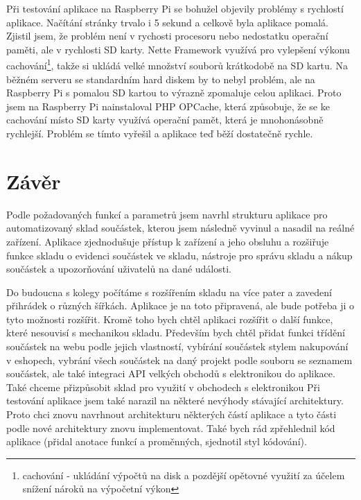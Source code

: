 \documentclass[12pt, a4paper, oneside]{article}
\begin{document}
Při testování aplikace na Raspberry Pi se bohužel objevily problémy s rychlostí aplikace. Načítání stránky trvalo i 5 sekund a celkově byla aplikace pomalá. Zjistil jsem, že problém není v rychosti procesoru nebo nedostatku operační paměti, ale v rychlosti SD karty. Nette Framework využívá pro vylepšení výkonu cachování\footnote{cachování - ukládání výpočtů na disk a pozdější opětovné využití za účelem snížení nároků na výpočetní výkon}, takže si ukládá velké množství souborů krátkodobě na SD kartu. Na běžném serveru se standardním hard diskem by to nebyl problém, ale na Raspberry Pi s pomalou SD kartou to výrazně zpomaluje celou aplikaci. Proto jsem na Raspberry Pi nainstaloval PHP OPCache, která způsobuje, že se ke cachování místo SD karty využívá operační pamět, která je mnohonásobně rychlejší. Problém se tímto vyřešil a aplikace teď běží dostatečně rychle.



\newpage

\section*{Závěr} %

Podle požadovaných funkcí a parametrů jsem navrhl strukturu aplikace pro automatizovaný sklad součástek, kterou  jsem následně vyvinul a nasadil na reálné zařízení.
Aplikace zjednodušuje přístup k zařízení a jeho obsluhu a rozšiřuje funkce skladu o evidenci součástek ve skladu, nástroje pro správu skladu a nákup součástek a upozorňování uživatelů na dané události.

Do budoucna s kolegy počítáme s rozšířením skladu na více pater a zavedení přihrádek o různých šířkách. Aplikace je na toto připravená, ale bude potřeba ji o tyto možnosti rozšířit.
Kromě toho bych chtěl aplikaci rozšířit o další funkce, které nesouvisí s mechanikou skladu. Především bych chtěl přidat funkci třídění součástek na webu podle jejich vlastností, vybírání součástek stylem nakupování v eshopech, vybrání všech součástek na daný projekt podle souboru se seznamem součástek, ale také integraci API velkých obchodů s elektronikou do aplikace. Také chceme přizpůsobit sklad pro využití v obchodech s elektronikou
Při testování aplikace jsem také narazil na některé nevýhody stávající architektury. Proto chci znovu navrhnout architekturu některých částí aplikace a tyto části podle nové architektury znovu implementovat. Také bych rád zpřehlednil kód aplikace (přidal anotace funkcí a proměnných, sjednotil styl kódování).
\end{document}
